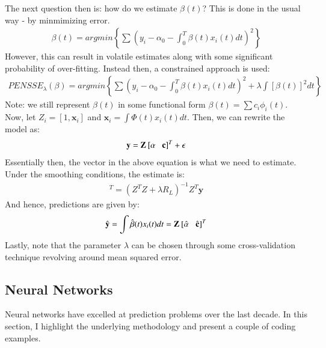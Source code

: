 \documentclass{article}
\begin{document}
\noindent The next question then is: how do we estimate $\beta(t)$? This is done in the usual way - by minmimizing error. 
\begin{align}
    \beta(t) = argmin\left\{\sum(y_{i} - \alpha_{0} -  \int_{0}^{T} \beta(t)x_i(t)dt)^{2} \right\}
\end{align}
\noindent However, this can result in volatile estimates along with some significant probability of over-fitting. Instead then, a constrained approach is used:
\begin{align}
    PENSSE_{\lambda}(\beta) = argmin\left\{\sum(y_{i} - \alpha_{0} -  \int_{0}^{T} \beta(t)x_i(t)dt)^{2} + \lambda \int[\beta(t)]^{2}dt \right\}
\end{align}
\noindent Note: we still represent $\beta(t)$ in some functional form $\beta(t) = \sum c_i\phi_i(t)$. Now, let $Z_i = [1, \textbf{x}_i]$ and $\textbf{x}_i = \int\Phi(t)x_i(t)dt$. Then, we can rewrite the model as: 
\begin{align}
    \textbf{y} = \textbf{Z} \hspace{0.2em}[\alpha \hspace{0.8em} \textbf{c}]^T + \epsilon
\end{align}
\noindent Essentially then, the vector in the above equation is what we need to estimate. Under the smoothing conditions, the estimate is:
\begin{align}
    [\hat{\alpha} \hspace{0.2em} \hat{c}^{T}]^{T} = (Z^{T}Z + \lambda R_{L})^{-1}Z^{T}\textbf{y}
\end{align}
\noindent And hence, predictions are given by:
\begin{align}
    \hat{\textbf{y}} = \int \hat{\beta}(t)x_i(t)dt =  \textbf{Z} \hspace{0.2em}[\hat{\alpha} \hspace{0.8em} \hat{\textbf{c}}]^T
\end{align}
\noindent Lastly, note that the parameter $\lambda$ can be chosen through some cross-validation technique revolving around mean squared error.


\subsection{Neural Networks}
\label{sec:nn}

\noindent Neural networks have excelled at prediction problems over the last decade. In this section, I highlight the underlying methodology and present a couple of coding examples.
\end{document}
